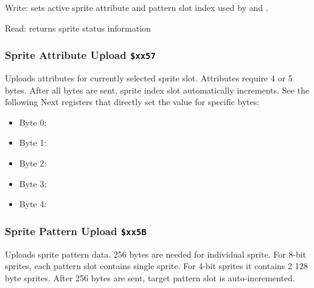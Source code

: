 Write: sets active sprite attribute and pattern slot index used by  and .

\begin{NextPort}
\end{NextPort}

Read: returns sprite status information

\begin{NextPort}
\end{NextPort}


\subsubsection{Sprite Attribute Upload {\tt \$xx57}}

Uploads attributes for currently selected sprite slot. Attributes require 4 or 5 bytes. After all bytes are sent, sprite index slot automatically increments. See the following Next registers that directly set the value for specific bytes:

\begin{itemize}[topsep=1pt,itemsep=1pt]
    \item Byte 0: 
    \item Byte 1: 
    \item Byte 2: 
    \item Byte 3: 
    \item Byte 4: 
\end{itemize}


\subsubsection{Sprite Pattern Upload {\tt \$xx5B}}

Uploads sprite pattern data. 256 bytes are needed for individual sprite. For 8-bit sprites, each pattern slot contains single sprite. For 4-bit sprites it contains 2 128 byte sprites. After 256 bytes are sent, target pattern slot is auto-incremented.

